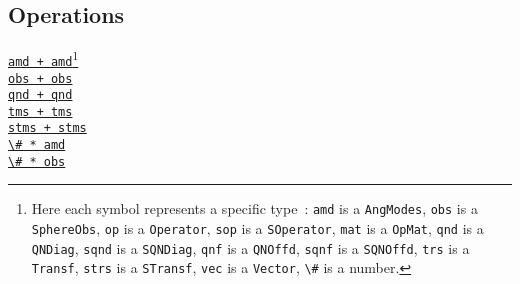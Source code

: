 \documentclass{timesjhep}
\begin{document}
\begin{multicols}{2}
    \subsection*{Operations}
    \noindent 
    \href{https://docs.fuzzified.world/models/\#Base.:+-Tuple{AngModes,\%20AngModes}}{\lstinline|amd + amd|}\footnote{Here each symbol represents a specific type~: \lstinline[basicstyle=\ttfamily\scriptsize]|amd| is a \lstinline[basicstyle=\ttfamily\scriptsize]|AngModes|,  \lstinline[basicstyle=\ttfamily\scriptsize]|obs| is a \lstinline[basicstyle=\ttfamily\scriptsize]|SphereObs|, \lstinline[basicstyle=\ttfamily\scriptsize]|op| is a \lstinline[basicstyle=\ttfamily\scriptsize]|Operator|, \lstinline[basicstyle=\ttfamily\scriptsize]|sop| is a \lstinline[basicstyle=\ttfamily\scriptsize]|SOperator|, \lstinline[basicstyle=\ttfamily\scriptsize]|mat| is a \lstinline[basicstyle=\ttfamily\scriptsize]|OpMat|, \lstinline[basicstyle=\ttfamily\scriptsize]|qnd| is a \lstinline[basicstyle=\ttfamily\scriptsize]|QNDiag|, \lstinline[basicstyle=\ttfamily\scriptsize]|sqnd| is a  \lstinline[basicstyle=\ttfamily\scriptsize]|SQNDiag|, \lstinline[basicstyle=\ttfamily\scriptsize]|qnf| is a \lstinline[basicstyle=\ttfamily\scriptsize]|QNOffd|, \lstinline[basicstyle=\ttfamily\scriptsize]|sqnf| is a  \lstinline[basicstyle=\ttfamily\scriptsize]|SQNOffd|, \lstinline[basicstyle=\ttfamily\scriptsize]|trs| is a \lstinline[basicstyle=\ttfamily\scriptsize]|Transf|, \lstinline[basicstyle=\ttfamily\scriptsize]|strs| is a \lstinline[basicstyle=\ttfamily\scriptsize]|STransf|, \lstinline[basicstyle=\ttfamily\scriptsize]|vec| is a \lstinline[basicstyle=\ttfamily\scriptsize]|Vector|, \lstinline[basicstyle=\ttfamily\scriptsize]|\#| is a number.}\\
    \href{https://docs.fuzzified.world/models/\#Base.:+-Tuple{SphereObs,\%20SphereObs}}{\lstinline|obs + obs|}\\
    \href{https://docs.fuzzified.world/core/\#Base.:+-Tuple{QNDiag,\%20QNDiag}}{\lstinline|qnd + qnd|}\\
    \href{https://docs.fuzzified.world/core/\#Base.:+-Tuple{Vector{Term},\%20Vector{Term}}}{\lstinline|tms + tms|}\\
    \href{https://docs.fuzzified.world/fuzzifino/\#Base.:+-Tuple{Vector{STerm},\%20Vector{STerm}}}{\lstinline|stms + stms|}\\
    \href{https://docs.fuzzified.world/models/\#Base.:*-Tuple{Number,\%20AngModes}}{\lstinline|\# * amd|}\\
    \href{https://docs.fuzzified.world/models/\#Base.:*-Tuple{Number,\%20SphereObs}}{\lstinline|\# * obs|}\\

\end{multicols}
\end{document}
